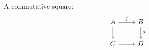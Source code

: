 \documentclass{article}
\begin{document}
A commutative square:
\begin{equation}
\begin{tikzcd}
A \arrow[r, "f"] \arrow[d] & B \arrow[d, "g"] \\
C \arrow[r] & D
\end{tikzcd}
\label{eq:square}
\end{equation}
\end{document}
